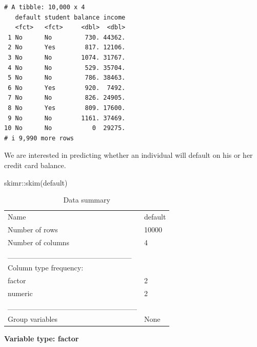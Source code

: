 \documentclass[
  letterpaper,
  DIV=11,
  numbers=noendperiod]{scrreprt}
\newenvironment{Shaded}{\begin{snugshade}}{\end{snugshade}}
\newcommand{\FunctionTok}[1]{\textcolor[rgb]{0.02,0.16,0.49}{#1}}
\newcommand{\NormalTok}[1]{\textcolor[rgb]{0.33,0.33,0.33}{#1}}
\newcommand{\SpecialCharTok}[1]{\textcolor[rgb]{0.00,0.46,0.62}{#1}}
\begin{document}
\begin{verbatim}
# A tibble: 10,000 x 4
   default student balance income
   <fct>   <fct>     <dbl>  <dbl>
 1 No      No         730. 44362.
 2 No      Yes        817. 12106.
 3 No      No        1074. 31767.
 4 No      No         529. 35704.
 5 No      No         786. 38463.
 6 No      Yes        920.  7492.
 7 No      No         826. 24905.
 8 No      Yes        809. 17600.
 9 No      No        1161. 37469.
10 No      No           0  29275.
# i 9,990 more rows
\end{verbatim}

We are interested in predicting whether an individual will default on
his or her credit card balance.

\begin{Shaded}
\begin{Highlighting}[]
\NormalTok{skimr}\SpecialCharTok{::}\FunctionTok{skim}\NormalTok{(default)}
\end{Highlighting}
\end{Shaded}

\begin{longtable}[]{@{}ll@{}}
\caption{Data summary}\tabularnewline
\toprule\noalign{}
\endfirsthead
\endhead
\bottomrule\noalign{}
\endlastfoot
Name & default \\
Number of rows & 10000 \\
Number of columns & 4 \\
\_\_\_\_\_\_\_\_\_\_\_\_\_\_\_\_\_\_\_\_\_\_\_ & \\
Column type frequency: & \\
factor & 2 \\
numeric & 2 \\
\_\_\_\_\_\_\_\_\_\_\_\_\_\_\_\_\_\_\_\_\_\_\_\_ & \\
Group variables & None \\
\end{longtable}

\textbf{Variable type: factor}
\end{document}
